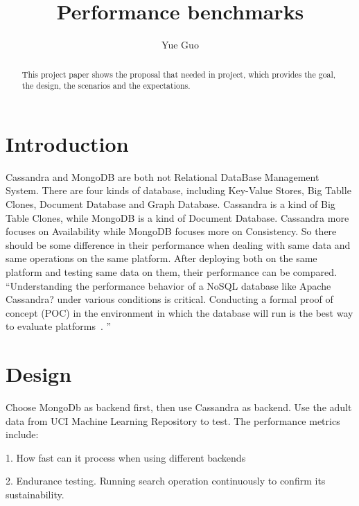 
\title{Performance benchmarks}

\author{Yue Guo}

\begin{abstract}
This project paper shows the proposal that needed in project, which 
provides the goal, the design, the scenarios and the expectations.
\end{abstract}



\maketitle


\section{Introduction}
Cassandra and MongoDB are both not Relational DataBase Management System. 
There are four kinds of database, including Key-Value Stores, Big Tablle 
Clones, Document Database and Graph Database. Cassandra is a kind of Big 
Table Clones, while MongoDB is a kind of Document Database. Cassandra more 
focuses on Availability while MongoDB focuses more on Consistency. So there
 should be some difference in their performance when dealing with same data 
 and same operations on the same platform. After deploying both on the same 
 platform and testing same data on them, their performance can be compared. ``Understanding the performance behavior of a NoSQL database like Apache Cassandra? under various conditions is critical. Conducting a formal proof of concept (POC) in the environment in which the database will run is the best way to evaluate platforms~\cite{hid-sp18-508-benchmarking}. ''


\section{Design}
Choose MongoDb as backend first, then use Cassandra as backend. Use the adult
 data from UCI Machine Learning Repository to test. The performance metrics include: 

1. How fast can it process when using different backends

2. Endurance testing. Running search operation continuously to confirm its 
sustainability.

